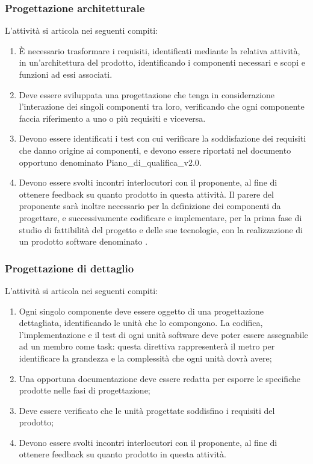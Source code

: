 \subsubsection{Progettazione architetturale}
L'attività si articola nei seguenti compiti:
\begin{enumerate}
    \item È necessario trasformare i requisiti, identificati mediante la relativa attività, in un'architettura del prodotto, identificando i componenti necessari e scopi e funzioni ad essi associati.
    \item Deve essere sviluppata una progettazione che tenga in considerazione l'interazione dei singoli componenti tra loro, verificando che ogni componente faccia riferimento a uno o più requisiti e viceversa.
    \item Devono essere identificati i test con cui verificare la soddisfazione dei requisiti che danno origine ai componenti, e devono essere riportati nel documento opportuno denominato Piano\_di\_qualifica\_v2.0.
    \item Devono essere svolti incontri interlocutori con il proponente, al fine di ottenere feedback su quanto prodotto in questa attività. Il parere del proponente sarà inoltre necessario per la definizione dei componenti da progettare, e successivamente codificare e implementare, per la prima fase di studio di fattibilità del progetto e delle sue tecnologie, con la realizzazione di un prodotto software denominato .
\end{enumerate}

\subsubsection{Progettazione di dettaglio}
L'attività si articola nei seguenti compiti:
\begin{enumerate}
    \item Ogni singolo componente deve essere oggetto di una progettazione dettagliata, identificando le unità che lo compongono. La codifica, l'implementazione e il test di ogni unità software deve poter essere assegnabile ad un membro come task: questa direttiva rappresenterà il metro per identificare la grandezza e la complessità che ogni unità dovrà avere;
    \item Una opportuna documentazione deve essere redatta per esporre le specifiche prodotte nelle fasi di progettazione;
    \item Deve essere verificato che le unità progettate soddisfino i requisiti del prodotto;
    \item Devono essere svolti incontri interlocutori con il proponente, al fine di ottenere feedback su quanto prodotto in questa attività.
\end{enumerate}

